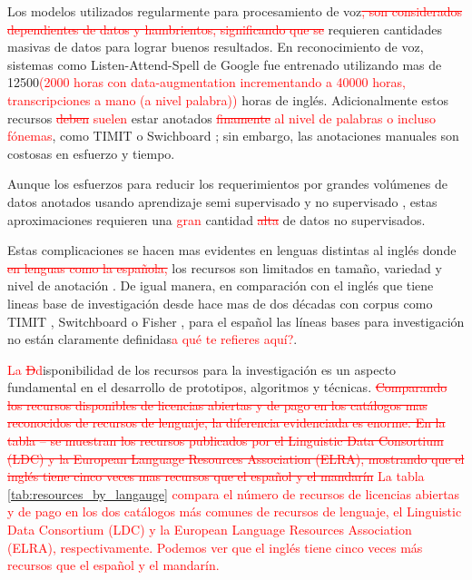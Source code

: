 \documentclass[a4paper,12pt,twoside]{report}
\newcommand{\macb}{\textcolor{red}}
\begin{document}
Los modelos utilizados regularmente para procesamiento de voz\macb{\st{, son considerados dependientes de datos y hambrientos, significando que se}} requieren cantidades masivas de datos para lograr buenos resultados. En reconocimiento de voz, sistemas como Listen-Attend-Spell de Google \cite{Chiu2018} fue entrenado utilizando mas de 12500\macb{(2000 horas con data-augmentation incrementando a 40000 horas, transcripciones a mano (a nivel palabra))} horas de inglés. Adicionalmente estos recursos \macb{\st{deben} suelen} estar anotados \macb{\st{finamente} al nivel de palabras o incluso f\'onemas}, como TIMIT \cite{TIMIT} o Swichboard \cite{Switchboard}; sin embargo, las anotaciones manuales son costosas en esfuerzo y tiempo.

Aunque los esfuerzos para reducir los requerimientos por grandes volúmenes de datos anotados usando aprendizaje semi supervisado \cite{AmazonSemiSupervised} y no supervisado \cite{ZeroResources}, estas aproximaciones requieren una \macb{gran} cantidad \macb{\st{alta}} de datos no supervisados.

Estas complicaciones se hacen mas evidentes en lenguas distintas al inglés donde \macb{\st{en lenguas como la espa\~nola,}} los recursos son limitados en tamaño, variedad y nivel de anotación \cite{HernndezMena2017}. De igual manera, en comparación con el inglés que  tiene lineas base de investigación desde hace mas de dos décadas con corpus como TIMIT \cite{TIMIT}, Switchboard \cite{Switchboard} o Fisher \cite{Fisher}, para el español las líneas bases para investigación no están claramente definidas\macb{a qu\'e te refieres aqu\'i?}.

\macb{La \st{D}d}isponibilidad de los recursos para la investigación es un aspecto fundamental en el desarrollo de prototipos, algoritmos y técnicas. \macb{\st{Comparando los recursos disponibles de licencias abiertas y de pago en los cat\'alogos mas reconocidos de recursos de lenguaje, la diferencia evidenciada es enorme. En la tabla -- se muestran los recursos publicados por el Linguistic Data Consortium (LDC) y la European Language Resources Association (ELRA), mostrando que el ingl\'es tiene cinco veces mas recursos que el espa\~nol y el mandar\'in} La tabla \ref{tab:resources_by_langauge} compara el n\'umero de recursos de licencias abiertas y de pago en los dos cat\'alogos m\'as comunes de recursos de lenguaje, el Linguistic Data Consortium (LDC) y la European Language Resources Association (ELRA), respectivamente. Podemos ver que el ingl\'es tiene cinco veces m\'as recursos que el espa\~nol y el mandar\'in.}
\end{document}
